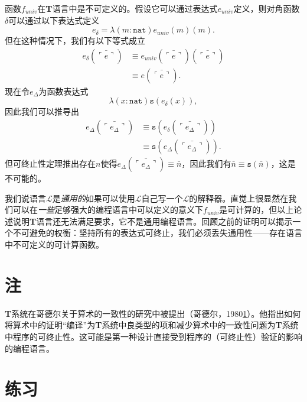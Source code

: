 函数$f_{univ}$在\textbf{T}语言中是不可定义的。假设它可以通过表达式$e_{univ}$定义，则对角函数$\delta$可以通过以下表达式定义
\begin{equation*}
e_\delta=\lambda(m:\mathtt{nat})e_{univ}(m)(m).
\end{equation*}
但在这种情况下，我们有以下等式成立
$$
\begin{array}{ll}
e_\delta(\bar{\ulcorner e\urcorner})  &\equiv e_{univ}(\bar{\ulcorner e\urcorner})(\bar{\ulcorner e\urcorner})\\
                                      &\equiv e(\bar{\ulcorner e\urcorner}).
\end{array}
$$
现在令$e_\Delta$为函数表达式
\begin{equation*}
\lambda(x:\mathtt{nat})\mathtt{s}(e_\delta(x)),
\end{equation*}
因此我们可以推导出
$$
\begin{array}{ll}
e_\Delta(\bar{\ulcorner e_\Delta\urcorner})    &\equiv\mathtt{s}(e_\delta(\bar{\ulcorner e_\Delta\urcorner}))\\
                                               &\equiv\mathtt{s}(e_\Delta(\bar{\ulcorner e_\Delta\urcorner})).
\end{array}
$$
但可终止性定理推出存在$n$使得$e_\Delta(\bar{\ulcorner e_\Delta\urcorner})\equiv\bar{n}$，因此我们有$\bar{n}\equiv\mathtt{s}(\bar{n})$，这是不可能的。

我们说语言$\mathcal{L}$是\textit{通用的}如果可以使用$\mathcal{L}$自己写一个$\mathcal{L}$的解释器。直觉上很显然在我们可以在\textit{一些}足够强大的编程语言中可以定义的意义下$f_{univ}$是可计算的，但以上论述说明\textbf{T}语言还无法满足要求，它不是通用编程语言。回顾之前的证明可以揭示一个不可避免的权衡：坚持所有的表达式可终止，我们必须丢失通用性——存在语言中不可定义的可计算函数。

\section{注}

\textbf{T}系统在哥德尔关于算术的一致性的研究中被提出（哥德尔，1980\ref{}）。他指出如何将算术中的证明“编译”为\textbf{T}系统中良类型的项和减少算术中的一致性问题为\textbf{T}系统中程序的可终止性。这可能是第一种设计直接受到程序的（可终止性）验证的影响的编程语言。

\section*{练习}

